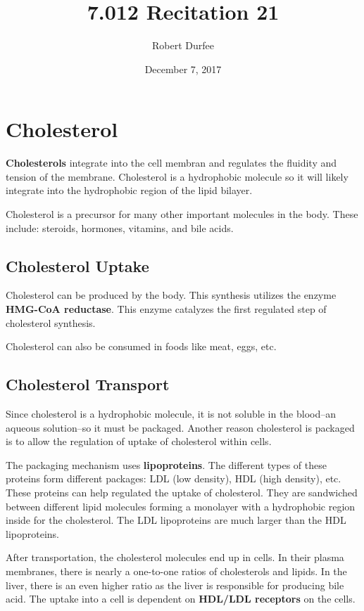 \documentclass{article}
\title{ 7.012 Recitation 21 }
\author{ Robert Durfee }
\date{ December 7, 2017 }
\begin{document}
\maketitle

\section{ Cholesterol }

\textbf{Cholesterols} integrate into the cell membran and regulates the fluidity
and tension of the membrane. Cholesterol is a hydrophobic molecule so it will
likely integrate into the hydrophobic region of the lipid bilayer.

Cholesterol is a precursor for many other important molecules in the body. These
include: steroids, hormones, vitamins, and bile acids.

\subsection{Cholesterol Uptake }

Cholesterol can be produced by the body. This synthesis utilizes the enzyme
\textbf{HMG-CoA reductase}. This enzyme catalyzes the first regulated step of
cholesterol synthesis.

Cholesterol can also be consumed in foods like meat, eggs, etc.

\subsection{ Cholesterol Transport }

Since cholesterol is a hydrophobic molecule, it is not soluble in the blood--an
aqueous solution--so it must be packaged. Another reason cholesterol is packaged
is to allow the regulation of uptake of cholesterol within cells. 

The packaging mechanism uses \textbf{lipoproteins}. The different types of
these proteins form different packages: LDL (low density), HDL (high density),
etc. These proteins can help regulated the uptake of cholesterol. They are
sandwiched between different lipid molecules forming a monolayer with a
hydrophobic region inside for the cholesterol. The LDL lipoproteins are much
larger than the HDL lipoproteins. 

After transportation, the cholesterol molecules end up in cells. In their plasma
membranes, there is nearly a one-to-one ratios of cholesterols and lipids. In
the liver, there is an even higher ratio as the liver is responsible for
producing bile acid. The uptake into a cell is dependent on \textbf{HDL/LDL
receptors} on the cells.
\end{document}
